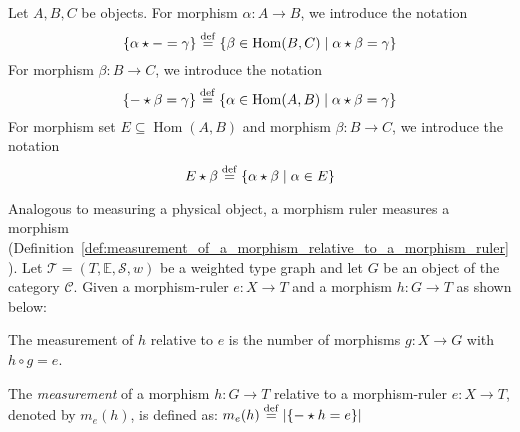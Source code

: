 \begin{notation}
Let \(A,B,C\) be objects. For morphism $\alpha\colon A\to B$, we introduce the notation 
          $$\{ \alpha \star - = \gamma \} \overset{\operatorname{def}}{=} \{ \beta \in \operatorname{Hom}(B, C) \mid \alpha \star \beta = \gamma \}$$ 
For morphism $\beta\colon B\to C$, we introduce the notation
          $$\{ - \star \beta = \gamma \}  \overset{\operatorname{def}}{=} \{ \alpha \in \operatorname{Hom}(A, B) \mid \alpha \star \beta = \gamma \}$$
For morphism set $E \subseteq \operatorname{Hom}(A,B)$ and morphism $\beta\colon B\to C$, we introduce the notation
          $$E \star \beta \overset{\operatorname{def}}{=} \{ \alpha \star \beta \mid \alpha \in E \}$$
\end{notation}
Analogous to measuring a physical object, a morphism ruler measures a morphism (Definition~\ref{def:measurement_of_a_morphism_relative_to_a_morphism_ruler}).
Let \(\mathcal{T}=(T,\mathbb{E},\mathcal{S},w)\) be a weighted type graph and let \(G\) be an object of the category \(\mathcal{C}\).
Given a morphism-ruler \(e\colon X\to T\) and a morphism \(h\colon G\to T\) as shown below:
\begin{center}
    \end{center}  
The measurement of \(h\) relative to \(e\) is the number of morphisms \(g \colon X\to G\) with \(h\circ g = e\). 
\begin{definition} 
    \label{def:measurement_of_a_morphism_relative_to_a_morphism_ruler}
    The \emph{measurement} of a morphism \( h:G \to T \) relative to a morphism-ruler \( e: X \to T \), denoted by $m_e(h)$, is defined as:
                \(
                m_e(h) 
                    \overset{\operatorname{def}}{=}
                |\{- \star h = e\}|
                \)
\end{definition}
